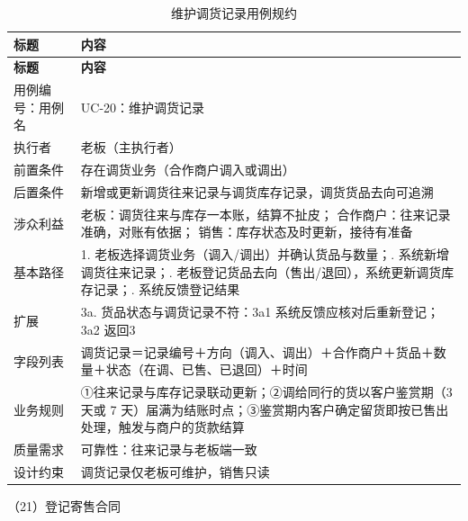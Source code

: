{\small
\begin{longtable}{@{}L{3.0cm} L{12.3cm}@{}}
\caption{维护调货记录用例规约}\label{tab:uc-20}\\
\toprule
\textbf{标题} & \textbf{内容} \\
\midrule
\endfirsthead
\toprule
\textbf{标题} & \textbf{内容} \\
\midrule
\endhead
用例编号：用例名 & UC-20：维护调货记录 \\
\midrule
执行者 & 老板（主执行者） \\
\midrule
前置条件 & 存在调货业务（合作商户调入或调出） \\
\midrule
后置条件 & 新增或更新调货往来记录与调货库存记录，调货货品去向可追溯 \\
\midrule
涉众利益 & 老板：调货往来与库存一本账，结算不扯皮；\newline
合作商户：往来记录准确，对账有依据；\newline
销售：库存状态及时更新，接待有准备 \\
\midrule
基本路径 & 1. 老板选择调货业务（调入/调出）并确认货品与数量；. 系统新增调货往来记录；. 老板登记货品去向（售出/退回），系统更新调货库存记录；. 系统反馈登记结果 \\
\midrule
扩展 & 3a. 货品状态与调货记录不符：3a1 系统反馈应核对后重新登记；3a2 返回3 \\
\midrule
字段列表 & 调货记录＝记录编号＋方向（调入、调出）＋合作商户＋货品＋数量＋状态（在调、已售、已退回）＋时间 \\
\midrule
业务规则 & ①往来记录与库存记录联动更新；\newline ②调给同行的货以客户鉴赏期（3 天或 7 天）届满为结账时点；\newline ③鉴赏期内客户确定留货即按已售出处理，触发与商户的货款结算 \\
\midrule
质量需求 & 可靠性：往来记录与老板端一致 \\
\midrule
设计约束 & 调货记录仅老板可维护，销售只读 \\
\midrule
\bottomrule
\end{longtable}}

\noindent（21）登记寄售合同

